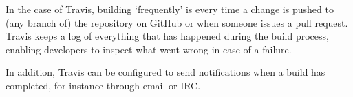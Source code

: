 In the case of Travis, building `frequently' is every time a change is pushed to (any branch of) the repository on GitHub or when someone issues a pull request.
Travis keeps a log of everything that has happened during the build process, enabling developers to inspect what went wrong in case of a failure.

In addition, Travis can be configured to send notifications when a build has completed, for instance through email or IRC.
